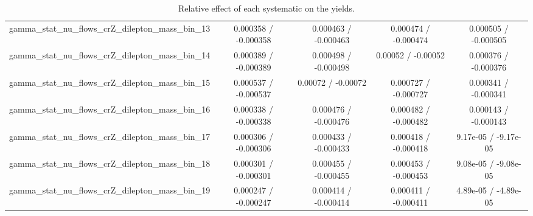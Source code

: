 \documentclass[10pt]{article}
\begin{document}
\begin{table}[htbp]
\begin{center}
\begin{tabular}{|c|c|c|c|c|}
  gamma_stat_nu_flows_crZ_dilepton_mass_bin_13 & 0.000358 / -0.000358 & 0.000463 / -0.000463 & 0.000474 / -0.000474 & 0.000505 / -0.000505 \\ 
  gamma_stat_nu_flows_crZ_dilepton_mass_bin_14 & 0.000389 / -0.000389 & 0.000498 / -0.000498 & 0.00052 / -0.00052 & 0.000376 / -0.000376 \\ 
  gamma_stat_nu_flows_crZ_dilepton_mass_bin_15 & 0.000537 / -0.000537 & 0.00072 / -0.00072 & 0.000727 / -0.000727 & 0.000341 / -0.000341 \\ 
  gamma_stat_nu_flows_crZ_dilepton_mass_bin_16 & 0.000338 / -0.000338 & 0.000476 / -0.000476 & 0.000482 / -0.000482 & 0.000143 / -0.000143 \\ 
  gamma_stat_nu_flows_crZ_dilepton_mass_bin_17 & 0.000306 / -0.000306 & 0.000433 / -0.000433 & 0.000418 / -0.000418 & 9.17e-05 / -9.17e-05 \\ 
  gamma_stat_nu_flows_crZ_dilepton_mass_bin_18 & 0.000301 / -0.000301 & 0.000455 / -0.000455 & 0.000453 / -0.000453 & 9.08e-05 / -9.08e-05 \\ 
  gamma_stat_nu_flows_crZ_dilepton_mass_bin_19 & 0.000247 / -0.000247 & 0.000414 / -0.000414 & 0.000411 / -0.000411 & 4.89e-05 / -4.89e-05 \\ 
\hline 
\end{tabular} 
\caption{Relative effect of each systematic on the yields.} 
\end{center} 
\end{table} 
\end{document}
